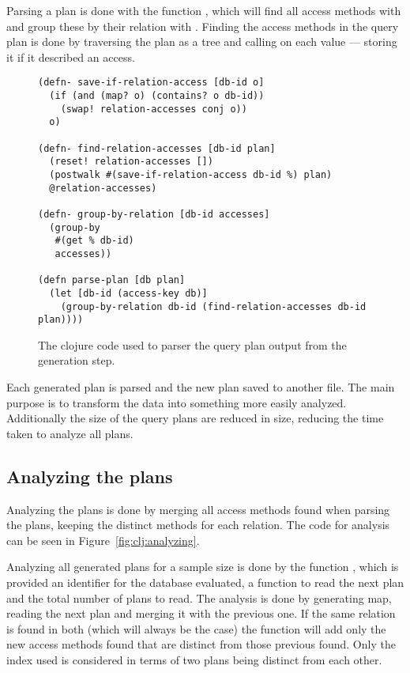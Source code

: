 Parsing a plan is done with the function , which will find all
access methods with  and group these by their relation
with . Finding the access methods in the query plan is
done by traversing the plan as a tree and calling 
on each value --- storing it if it described an access.

\begin{figure}[ht]
\begin{verbatim}
(defn- save-if-relation-access [db-id o]
  (if (and (map? o) (contains? o db-id))
    (swap! relation-accesses conj o))
  o)

(defn- find-relation-accesses [db-id plan]
  (reset! relation-accesses [])
  (postwalk #(save-if-relation-access db-id %) plan)
  @relation-accesses)

(defn- group-by-relation [db-id accesses]
  (group-by
   #(get % db-id)
   accesses))

(defn parse-plan [db plan]
  (let [db-id (access-key db)]
    (group-by-relation db-id (find-relation-accesses db-id plan))))
   \end{verbatim}
   \caption[The clojure code to parse a query]{The clojure code used to parser
     the query plan output from the generation step.}
\label{fig:clj:parsing}
\end{figure}

Each generated plan is parsed and the new plan saved to another file. The main
purpose is to transform the data into something more easily analyzed.
Additionally the size of the query plans are reduced in size, reducing the
time taken to analyze all plans.

\subsection{Analyzing the plans}\label{sec:analyzingplans}
Analyzing the plans is done by merging all access methods found when parsing the
plans, keeping the distinct methods for each relation. The code for analysis can
be seen in Figure~\ref{fig:clj:analyzing}.

Analyzing all generated plans for a sample size is done by the function
, which is provided an identifier for the database evaluated,
a function to read the next plan and the total number of plans to read. The
analysis is done by generating map, reading the next plan and merging it with
the previous one. If the same relation is found in both (which will always be
the case) the function  will add only the new access methods
found that are distinct from those previous found. Only the index used is
considered in terms of two plans being distinct from each other.

